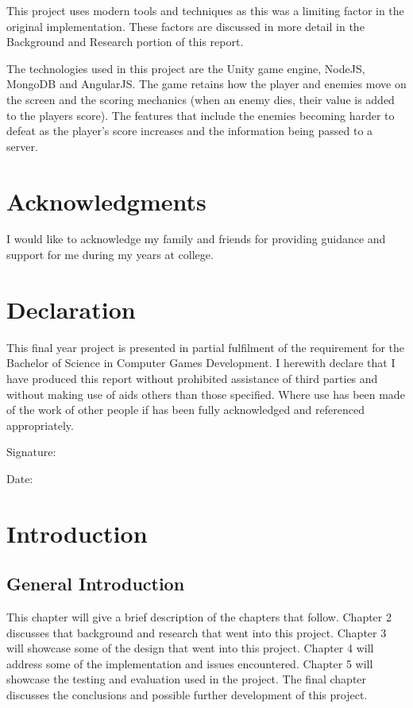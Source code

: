 \documentclass[12pt]{article}
\begin{document}
This project uses modern tools and techniques as this was a limiting factor in the original implementation. These factors are discussed in more detail in the Background and Research portion of this report. 

The technologies used in this project are the Unity game engine, NodeJS, MongoDB and AngularJS. The game retains how the player and enemies move on the screen and the scoring mechanics (when an enemy dies, their value is added to the players score). The features that include the enemies becoming harder to defeat as the player's score increases and the information being passed to a server. 

\newpage
\section*{Acknowledgments}
I would like to acknowledge my family and friends for providing guidance and support for me during my years at college. 
\newpage
\section*{Declaration}
This final year project is presented in partial fulfilment of the requirement for the Bachelor of Science in Computer Games Development. I herewith declare that I have produced this report without prohibited assistance of third parties and without making use of aids others than those specified. Where use has been made of the work of other people if has been fully acknowledged and referenced appropriately. 

Signature: \underline{\hspace{5cm}}

Date: \underline{\hspace{5.9cm}}
\newpage

\begin{center}
\tableofcontents
\end{center}

\newpage
{}

\section{Introduction}


\subsection{General Introduction}
This chapter will give a brief description of the chapters that follow. Chapter 2  discusses that background and research that went into this project. Chapter 3 will showcase some of the design that went into this project. Chapter 4 will address some of the implementation and issues encountered. Chapter 5 will showcase the testing and evaluation used in the project. The final chapter discusses the conclusions and possible further development of this project.
\end{document}
